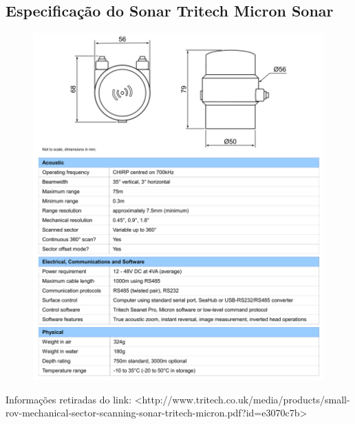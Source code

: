 \begin{anexosenv}
\chapter{Especificação do Sonar Tritech Micron Sonar}
\label{chap:especificacao_sonar}
\begin{figure}[H]
    \centering
    \includegraphics[scale=0.4]{dados/figuras/especificacao_sonar.png}
\end{figure}

Informações retiradas do link: <http://www.tritech.co.uk/media/products/small-rov-mechanical-sector-scanning-sonar-tritech-micron.pdf?id=e3070c7b>

\end{anexosenv}
